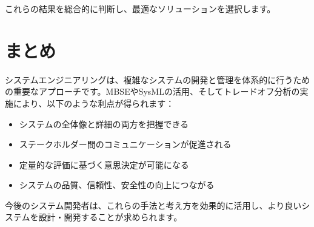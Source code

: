 これらの結果を総合的に判断し、最適なソリューションを選択します。

\section{まとめ}

システムエンジニアリングは、複雑なシステムの開発と管理を体系的に行うための重要なアプローチです。MBSEやSysMLの活用、そしてトレードオフ分析の実施により、以下のような利点が得られます：

\begin{itemize}
    \item システムの全体像と詳細の両方を把握できる
    \item ステークホルダー間のコミュニケーションが促進される
    \item 定量的な評価に基づく意思決定が可能になる
    \item システムの品質、信頼性、安全性の向上につながる
\end{itemize}

今後のシステム開発者は、これらの手法と考え方を効果的に活用し、より良いシステムを設計・開発することが求められます。

